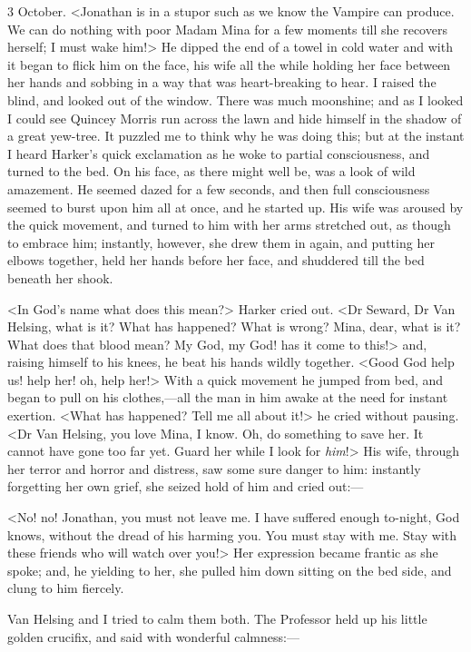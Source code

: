 \begin{diary}{3 October.}
<Jonathan is in a stupor such as we know the Vampire can produce. We can do nothing with poor Madam Mina for a few moments till she recovers herself; I must wake him!> He dipped the end of a towel in cold water and with it began to flick him on the face, his wife all the while holding her face between her hands and sobbing in a way that was heart-breaking to hear. I raised the blind, and looked out of the window. There was much moonshine; and as I looked I could see Quincey Morris run across the lawn and hide himself in the shadow of a great yew-tree. It puzzled me to think why he was doing this; but at the instant I heard Harker's quick exclamation as he woke to partial consciousness, and turned to the bed. On his face, as there might well be, was a look of wild amazement. He seemed dazed for a few seconds, and then full consciousness seemed to burst upon him all at once, and he started up. His wife was aroused by the quick movement, and turned to him with her arms stretched out, as though to embrace him; instantly, however, she drew them in again, and putting her elbows together, held her hands before her face, and shuddered till the bed beneath her shook.

<In God's name what does this mean?> Harker cried out. <Dr Seward, Dr Van Helsing, what is it? What has happened? What is wrong? Mina, dear, what is it? What does that blood mean? My God, my God! has it come to this!> and, raising himself to his knees, he beat his hands wildly together. <Good God help us! help her! oh, help her!> With a quick movement he jumped from bed, and began to pull on his clothes,—all the man in him awake at the need for instant exertion. <What has happened? Tell me all about it!> he cried without pausing. <Dr Van Helsing, you love Mina, I know. Oh, do something to save her. It cannot have gone too far yet. Guard her while I look for \textit{him}!> His wife, through her terror and horror and distress, saw some sure danger to him: instantly forgetting her own grief, she seized hold of him and cried out:—

<No! no! Jonathan, you must not leave me. I have suffered enough to-night, God knows, without the dread of his harming you. You must stay with me. Stay with these friends who will watch over you!> Her expression became frantic as she spoke; and, he yielding to her, she pulled him down sitting on the bed side, and clung to him fiercely.

Van Helsing and I tried to calm them both. The Professor held up his little golden crucifix, and said with wonderful calmness:—


\end{diary}
